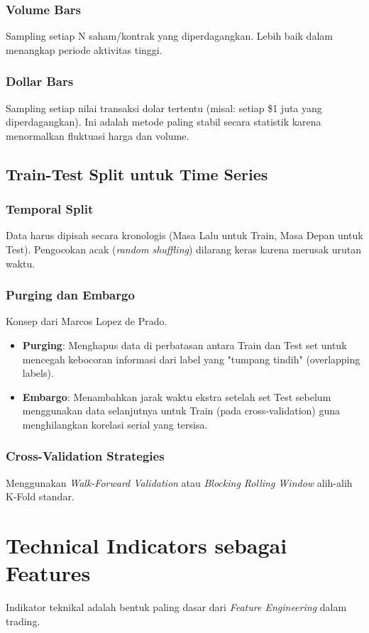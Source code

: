 \documentclass[12pt,a4paper]{book}
\begin{document}
\subsection{Volume Bars}
Sampling setiap N saham/kontrak yang diperdagangkan. Lebih baik dalam menangkap periode aktivitas tinggi.

\subsection{Dollar Bars}
Sampling setiap nilai transaksi dolar tertentu (misal: setiap \$1 juta yang diperdagangkan). Ini adalah metode paling stabil secara statistik karena menormalkan fluktuasi harga dan volume.

\section{Train-Test Split untuk Time Series}
\subsection{Temporal Split}
Data harus dipisah secara kronologis (Masa Lalu untuk Train, Masa Depan untuk Test). Pengocokan acak (\textit{random shuffling}) dilarang keras karena merusak urutan waktu.

\subsection{Purging dan Embargo}
Konsep dari Marcos Lopez de Prado.
\begin{itemize}
    \item \textbf{Purging}: Menghapus data di perbatasan antara Train dan Test set untuk mencegah kebocoran informasi dari label yang "tumpang tindih" (overlapping labels).
    \item \textbf{Embargo}: Menambahkan jarak waktu ekstra setelah set Test sebelum menggunakan data selanjutnya untuk Train (pada cross-validation) guna menghilangkan korelasi serial yang tersisa.
\end{itemize}

\subsection{Cross-Validation Strategies}
Menggunakan \textit{Walk-Forward Validation} atau \textit{Blocking Rolling Window} alih-alih K-Fold standar.

\chapter{Technical Indicators sebagai Features}
Indikator teknikal adalah bentuk paling dasar dari \textit{Feature Engineering} dalam trading.
\end{document}
